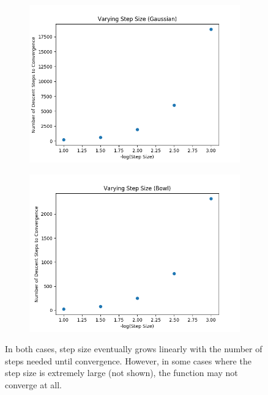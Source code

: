 \documentclass{article}
\begin{document}
\begin{figure}[H]
\centering
        \begin{subfigure}[b]{0.4\textwidth}
                \includegraphics[width=\linewidth]{../P1/figs/step_gauss.png}
        \end{subfigure}%
        \begin{subfigure}[b]{0.4\textwidth}
                \includegraphics[width=\linewidth]{../P1/figs/step_bowl.png}
        \end{subfigure}%
\caption*{In both cases, step size eventually grows linearly with the number of steps needed until convergence. However, in some cases where the step size is extremely large (not shown), the function may not converge at all.}
\end{figure}
\end{document}
